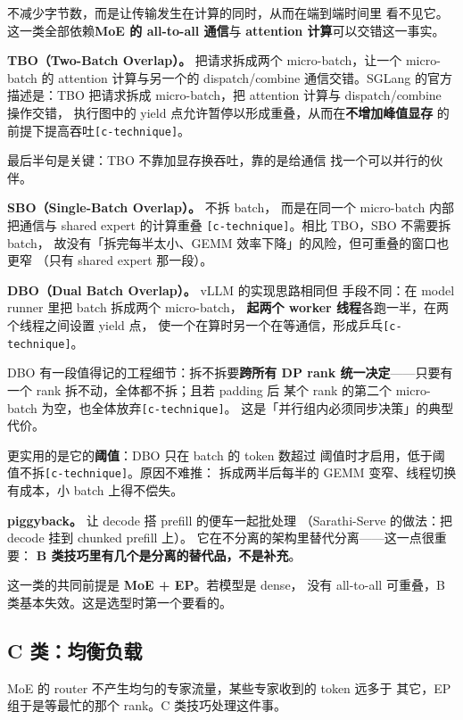 不减少字节数，而是让传输发生在计算的同时，从而在端到端时间里
看不见它。这一类全部依赖\textbf{MoE 的 all-to-all 通信}与
\textbf{attention 计算}可以交错这一事实。

\noindent\textbf{TBO（Two-Batch Overlap）。} 把请求拆成两个
micro-batch，让一个 micro-batch 的 attention 计算与另一个的
dispatch/combine 通信交错。SGLang 的官方描述是：TBO 把请求拆成
micro-batch，把 attention 计算与 dispatch/combine 操作交错，
执行图中的 yield 点允许暂停以形成重叠，从而在\textbf{不增加峰值显存}
的前提下提高吞吐\texttt{[c-technique]}。

\noindent 最后半句是关键：TBO 不靠加显存换吞吐，靠的是给通信
找一个可以并行的伙伴。

\noindent\textbf{SBO（Single-Batch Overlap）。} 不拆 batch，
而是在同一个 micro-batch 内部把通信与 shared expert 的计算重叠
\texttt{[c-technique]}。相比 TBO，SBO 不需要拆 batch，
故没有「拆完每半太小、GEMM 效率下降」的风险，但可重叠的窗口也更窄
（只有 shared expert 那一段）。

\noindent\textbf{DBO（Dual Batch Overlap）。} vLLM 的实现思路相同但
手段不同：在 model runner 里把 batch 拆成两个 micro-batch，
\textbf{起两个 worker 线程}各跑一半，在两个线程之间设置 yield 点，
使一个在算时另一个在等通信，形成乒乓\texttt{[c-technique]}。

\noindent DBO 有一段值得记的工程细节：拆不拆要\textbf{跨所有 DP rank
统一决定}——只要有一个 rank 拆不动，全体都不拆；且若 padding 后
某个 rank 的第二个 micro-batch 为空，也全体放弃\texttt{[c-technique]}。
这是「并行组内必须同步决策」的典型代价。

\noindent 更实用的是它的\textbf{阈值}：DBO 只在 batch 的 token 数超过
阈值时才启用，低于阈值不拆\texttt{[c-technique]}。原因不难推：
拆成两半后每半的 GEMM 变窄、线程切换有成本，小 batch 上得不偿失。

\noindent\textbf{piggyback。} 让 decode 搭 prefill 的便车一起批处理
（Sarathi-Serve 的做法：把 decode 挂到 chunked prefill 上）。
它在不分离的架构里替代分离——这一点很重要：
\textbf{B 类技巧里有几个是分离的替代品，不是补充}。

\noindent 这一类的共同前提是 \textbf{MoE + EP}。若模型是 dense，
没有 all-to-all 可重叠，B 类基本失效。这是选型时第一个要看的。

\subsection{C 类：均衡负载}

MoE 的 router 不产生均匀的专家流量，某些专家收到的 token 远多于
其它，EP 组于是等最忙的那个 rank。C 类技巧处理这件事。


